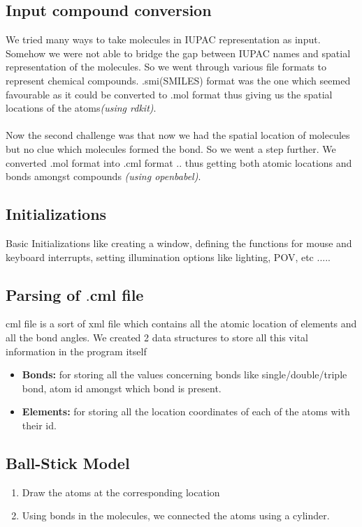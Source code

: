 \documentclass{report}
\begin{document}
\subsection*{Input compound conversion}
We tried many ways to take molecules in IUPAC representation as input. Somehow we were not able to bridge the gap between IUPAC names and spatial representation of the molecules.
So we went through various file formats to represent chemical compounds. .smi(SMILES) format was the one which seemed favourable as it could be converted to .mol format thus giving us the spatial locations of the atoms\textit{(using rdkit)}.\\
\\
Now the second challenge was that now we had the spatial location of molecules but no clue which molecules formed the bond. So we went a step further. We converted .mol format into .cml format .. thus getting both atomic locations and bonds amongst compounds \textit{(using openbabel)}.

\subsection*{Initializations}
Basic Initializations like creating a window, defining the functions for mouse and keyboard interrupts, setting illumination options like lighting, POV, etc ..... 

\subsection*{Parsing of $.$cml file}
cml file is a sort of xml file which contains all the atomic location of elements and all the bond angles.
We created 2 data structures to store all this vital information in the program itself
\begin{itemize}
\item	\textbf{Bonds:} for storing all the values concerning bonds like single/double/triple bond, atom id amongst which bond is present.
\item	\textbf{Elements:} for storing all the location coordinates of each of the atoms with their id.
\end{itemize}
\subsection*{Ball-Stick Model}
\begin{enumerate}
\item	Draw the atoms at the corresponding location
\item	Using bonds in the molecules, we connected the atoms  using a cylinder.
\end{enumerate}
\end{document}
